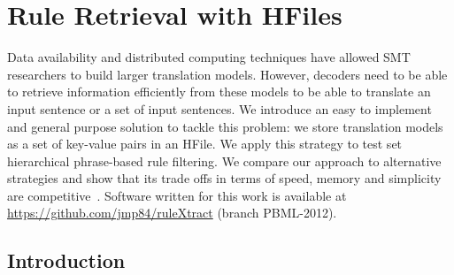 \chapter{Rule Retrieval with HFiles}
\label{chap:hfile}


Data availability and distributed computing techniques have allowed SMT
researchers to build larger translation models. However, decoders need to be
able to retrieve information efficiently from these models to be able to
translate an input sentence or a set of input sentences. We introduce an easy to
implement and general purpose solution to tackle this problem: we store
translation models as a set of key-value pairs in an HFile. We apply this
strategy to test set hierarchical phrase-based rule filtering. We compare our
approach to alternative strategies and show that its trade offs in terms
of speed, memory and simplicity are
competitive~\citep{pino-waite-byrne:2012:PBML}. Software written for this work
is available at \url{https://github.com/jmp84/ruleXtract} (branch PBML-2012).

\section{Introduction}
\label{sec:hfileIntro}

